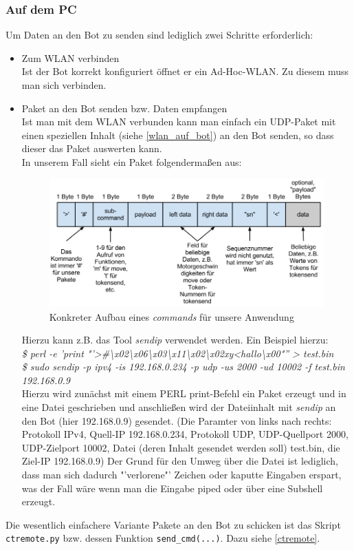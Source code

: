 \subsubsection{Auf dem PC}
Um Daten an den Bot zu senden sind lediglich zwei Schritte erforderlich:
\begin{itemize}
	\item Zum WLAN verbinden\\
	Ist der Bot korrekt konfiguriert öffnet er ein Ad-Hoc-WLAN. Zu diesem muss man sich verbinden.
	\item Paket an den Bot senden bzw. Daten empfangen\\
	Ist man mit dem WLAN verbunden kann man einfach ein UDP-Paket mit einen speziellen Inhalt (siehe \ref{wlan_auf_bot}) an den Bot senden, so dass dieser das Paket auswerten kann.\\
	In unserem Fall sieht ein Paket folgendermaßen aus:
	\begin{figure}[H]
		\centering
		\includegraphics[scale=0.5]{pic/ctBotWlanKonkret}
		\caption{Konkreter Aufbau eines \textit{commands} für unsere Anwendung}
		\label{ctBotWlanKonkret}
	\end{figure}
	
	Hierzu kann z.B. das Tool \textit{sendip} verwendet werden. Ein Beispiel hierzu:\\
	\textit{\$ perl -e 'print "'>#\textbackslash x02\textbackslash x06\textbackslash x03\textbackslash x11\textbackslash x02\textbackslash x02xy<hallo\textbackslash x00"'' > test.bin\\
	\$ sudo sendip -p ipv4 -is 192.168.0.234 -p udp -us 2000 -ud 10002 -f test.bin 192.168.0.9}\\
	Hierzu wird zunächst mit einem PERL print-Befehl ein Paket erzeugt und in eine Datei geschrieben und anschließen wird der Dateiinhalt mit \textit{sendip} an den Bot (hier 192.168.0.9) gesendet.
	(Die Paramter von links nach rechts: Protokoll IPv4, Quell-IP 192.168.0.234, Protokoll UDP, UDP-Quellport 2000, UDP-Zielport 10002, Datei (deren Inhalt gesendet werden soll) test.bin, die Ziel-IP 192.168.0.9)
	Der Grund für den Umweg über die Datei ist lediglich, dass man sich dadurch "'verlorene"' Zeichen oder kaputte Eingaben erspart, was der Fall wäre wenn man die Eingabe piped oder über eine Subshell erzeugt.
\end{itemize}
Die wesentlich einfachere Variante Pakete an den Bot zu schicken ist das Skript \verb+ctremote.py+ bzw. dessen Funktion \verb+send_cmd(...)+. Dazu siehe \ref{ctremote}.

